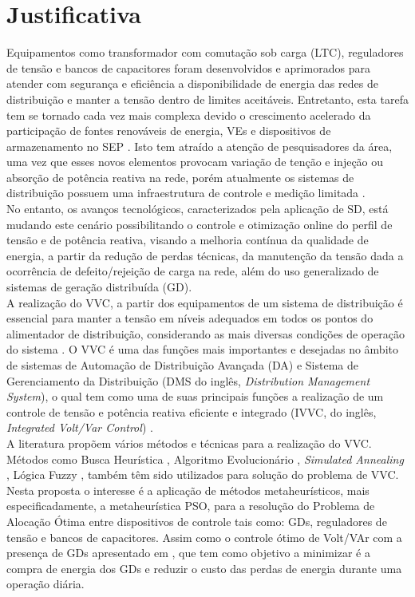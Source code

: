 \documentclass[]{IEEEphot}
\begin{document}
\section{Justificativa}

Equipamentos como transformador com comutação sob carga (LTC), reguladores de tensão e bancos de capacitores foram desenvolvidos e aprimorados para atender com segurança e eficiência a disponibilidade de energia das redes de distribuição e manter a tensão dentro de limites aceitáveis. Entretanto, esta tarefa tem se tornado cada vez
mais complexa devido o crescimento acelerado da participação de fontes renováveis de energia, VEs e dispositivos de armazenamento no SEP \cite{Mercer2016}. Isto tem atraído a atenção de pesquisadores da área, uma vez que esses novos elementos provocam variação de tenção e injeção ou absorção de potência reativa na rede, porém atualmente os sistemas de distribuição possuem uma infraestrutura de controle e medição limitada \cite{Mello2018}.\\
No entanto, os avanços tecnológicos, caracterizados pela aplicação de SD, está mudando este cenário possibilitando o controle e otimização online do perfil de tensão e de potência reativa, visando a melhoria contínua da qualidade de energia, a partir da redução de perdas técnicas, da manutenção da tensão dada a ocorrência de defeito/rejeição de carga na rede, além do uso generalizado de sistemas de geração distribuída (GD).\\
A realização do VVC, a partir dos equipamentos de um sistema de distribuição é essencial para manter a tensão em níveis adequados em todos os pontos do alimentador de distribuição, considerando as mais diversas condições de operação do sistema \cite{Fassbinder2016}. O VVC é uma das funções mais importantes e desejadas no âmbito de sistemas de Automação de Distribuição Avançada (DA) e Sistema de Gerenciamento da Distribuição (DMS do inglês, \textit{Distribution Management System}), o qual tem como uma de suas principais funções a realização de um controle de tensão e potência reativa eficiente e integrado (IVVC, do inglês, \textit{Integrated Volt/Var Control}) \cite{Mercer2016}.\\
A literatura propõem vários métodos e técnicas para a realização do VVC. Métodos como Busca Heurística \cite{Deng2002}, Algoritmo Evolucionário \cite{Ulinuha2008}, \textit{Simulated Annealing} \cite{LiangeWang2003}, Lógica Fuzzy \cite{(LiangeWang2003}, também têm sido utilizados para solução do problema de VVC. Nesta proposta o interesse é a aplicação de métodos metaheurísticos, mais especificadamente, a metaheurística PSO,  para a resolução do Problema de Alocação Ótima entre dispositivos de controle tais como: GDs, reguladores de tensão e bancos de capacitores. Assim como o controle ótimo de Volt/VAr com a presença de GDs apresentado em \cite{Auchariyamet2010}, que tem como objetivo a minimizar é a compra de energia dos GDs e reduzir o custo das perdas de energia durante uma operação diária.\\
\end{document}

